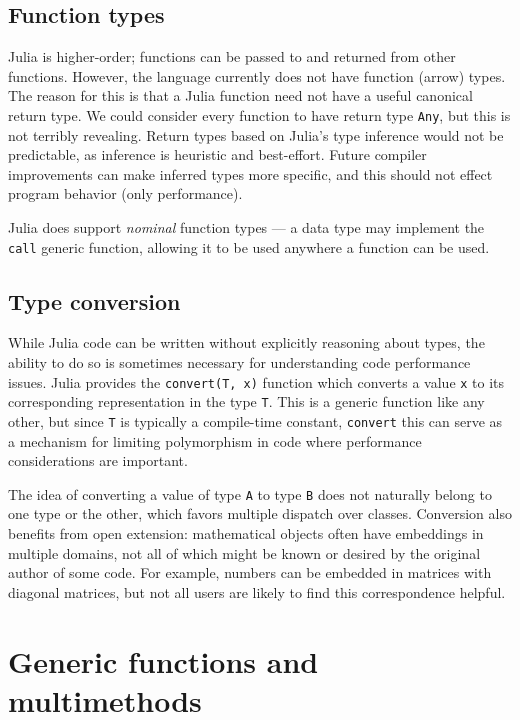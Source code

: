 \documentclass[10pt, preprint]{sigplanconf}
\begin{document}
\subsection{Function types}

Julia is higher-order; functions can be passed to and returned from other
functions.
However, the language currently does not have function (arrow) types.
The reason for this is that a Julia function need not have a useful canonical
return type.
We could consider every function to have return type \verb|Any|, but this is
not terribly revealing.
Return types based on Julia's type inference would not be predictable, as
inference is heuristic and best-effort.
Future compiler improvements can make inferred types more specific,
and this should not effect program behavior (only performance).

Julia does support \emph{nominal} function types --- a data type may implement
the \verb|call| generic function, allowing it to be used anywhere a function
can be used.

\subsection{Type conversion}

While Julia code can be written without
explicitly reasoning about types, the ability to do so is sometimes necessary for
understanding code performance issues. Julia provides the \verb|convert(T, x)|
function which converts a value \verb|x| to its corresponding representation in
the type \verb|T|. This is a generic function like any other, but since
\verb|T| is typically a compile-time constant, \verb|convert| this can serve
as a mechanism for limiting polymorphism in code where performance
considerations are important.

The idea of converting a value of type \verb|A| to type \verb|B|
does not naturally belong to one type or the other, which favors multiple
dispatch over classes. Conversion also benefits from open extension:
mathematical objects often have embeddings in multiple domains, not all of
which might be known or desired by the original author of some code. For
example, numbers can be embedded in matrices with diagonal matrices, but not
all users are likely to find this correspondence helpful.


\section{Generic functions and multimethods}
\end{document}

